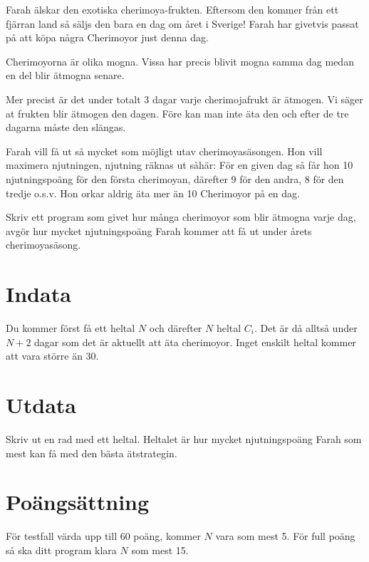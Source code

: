 
Farah älskar den exotiska cherimoya-frukten. Eftersom den kommer från ett
fjärran land så säljs den bara en dag om året i Sverige! Farah har givetvis
passat på att köpa några Cherimoyor just denna dag.

Cherimoyorna är olika mogna. Vissa har precis blivit mogna samma dag medan en
del blir ätmogna senare.

Mer precist är det under totalt 3 dagar varje cherimojafrukt är ätmogen. Vi
säger at frukten blir ätmogen den dagen. Före kan man inte äta den och efter de
tre dagarna måste den slängas.

Farah vill få ut så mycket som möjligt utav cherimoyasäsongen. Hon vill
maximera njutningen, njutning räknas ut såhär: För en given dag så får hon 10
njutningspoäng för den första cherimoyan, därefter 9 för den andra, 8 för den
tredje o.s.v. Hon orkar aldrig äta mer än 10 Cherimoyor på en dag.

Skriv ett program som givet hur många cherimoyor som blir ätmogna varje dag,
avgör hur mycket njutningspoäng Farah kommer att få ut under årets
cherimoyasäsong.

\section*{Indata}

Du kommer först få ett heltal $N$ och därefter $N$ heltal
$C_i$. Det är då alltså under $N+2$ dagar som det är aktuellt att äta cherimoyor.
Inget enskilt heltal kommer att vara större än 30.

\section*{Utdata}

Skriv ut en rad med ett heltal. Heltalet är hur mycket njutningspoäng Farah som
mest kan få med den bästa ätstrategin.

\section*{Poängsättning}

För testfall värda upp till $60$ poäng, kommer $N$ vara som mest 5. För full
poäng så ska ditt program klara $N$ som mest 15.
